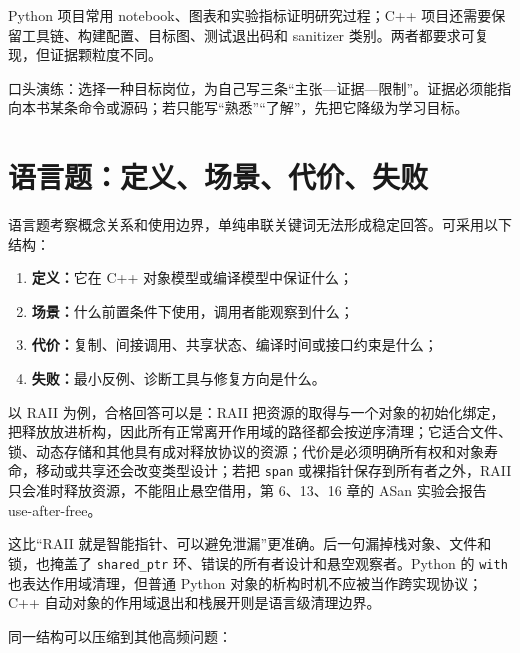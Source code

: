 \begin{pythonbridge}
Python 项目常用 notebook、图表和实验指标证明研究过程；C++ 项目还需要保留工具链、构建配置、目标图、测试退出码和 sanitizer 类别。两者都要求可复现，但证据颗粒度不同。

\end{pythonbridge}

口头演练：选择一种目标岗位，为自己写三条“主张—证据—限制”。证据必须能指向本书某条命令或源码；若只能写“熟悉”“了解”，先把它降级为学习目标。

\section{语言题：定义、场景、代价、失败}

语言题考察概念关系和使用边界，单纯串联关键词无法形成稳定回答。可采用以下结构：

\begin{enumerate}[label=\arabic*.]
  \item \textbf{定义：}它在 C++ 对象模型或编译模型中保证什么；
  \item \textbf{场景：}什么前置条件下使用，调用者能观察到什么；
  \item \textbf{代价：}复制、间接调用、共享状态、编译时间或接口约束是什么；
  \item \textbf{失败：}最小反例、诊断工具与修复方向是什么。
\end{enumerate}

以 RAII 为例，合格回答可以是：RAII 把资源的取得与一个对象的初始化绑定，把释放放进析构，因此所有正常离开作用域的路径都会按逆序清理；它适合文件、锁、动态存储和其他具有成对释放协议的资源；代价是必须明确所有权和对象寿命，移动或共享还会改变类型设计；若把 \texttt{span} 或裸指针保存到所有者之外，RAII 只会准时释放资源，不能阻止悬空借用，第 6、13、16 章的 ASan 实验会报告 use-after-free。

这比“RAII 就是智能指针、可以避免泄漏”更准确。后一句漏掉栈对象、文件和锁，也掩盖了 \texttt{shared\_ptr} 环、错误的所有者设计和悬空观察者。Python 的 \texttt{with} 也表达作用域清理，但普通 Python 对象的析构时机不应被当作跨实现协议；C++ 自动对象的作用域退出和栈展开则是语言级清理边界。

同一结构可以压缩到其他高频问题：

